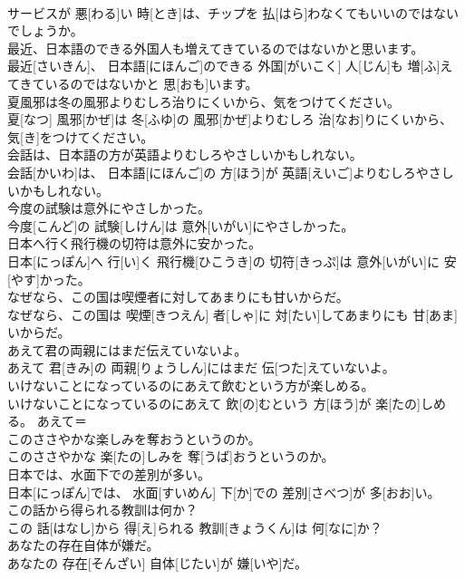 \documentclass[8pt]{extreport}
\begin{document}
\begin{CJK}{UTF8}{min}
\\	サービスが 悪[わる]い 時[とき]は、チップを 払[はら]わなくてもいいのではないでしょうか。	
\\	最近、日本語のできる外国人も増えてきているのではないかと思います。	
\\	最近[さいきん]、 日本語[にほんご]のできる 外国[がいこく] 人[じん]も 増[ふ]えてきているのではないかと 思[おも]います。	
\\	夏風邪は冬の風邪よりむしろ治りにくいから、気をつけてください。	
\\	夏[なつ] 風邪[かぜ]は 冬[ふゆ]の 風邪[かぜ]よりむしろ 治[なお]りにくいから、 気[き]をつけてください。	
\\	会話は、日本語の方が英語よりむしろやさしいかもしれない。	
\\	会話[かいわ]は、 日本語[にほんご]の 方[ほう]が 英語[えいご]よりむしろやさしいかもしれない。	
\\	今度の試験は意外にやさしかった。	
\\	今度[こんど]の 試験[しけん]は 意外[いがい]にやさしかった。	
\\	日本へ行く飛行機の切符は意外に安かった。	
\\	日本[にっぽん]へ 行[い]く 飛行機[ひこうき]の 切符[きっぷ]は 意外[いがい]に 安[やす]かった。	
\\	なぜなら、この国は喫煙者に対してあまりにも甘いからだ。	
\\	なぜなら、この国は 喫煙[きつえん] 者[しゃ]に 対[たい]してあまりにも 甘[あま]いからだ。	
\\	あえて君の両親にはまだ伝えていないよ。	
\\	あえて 君[きみ]の 両親[りょうしん]にはまだ 伝[つた]えていないよ。	
\\	いけないことになっているのにあえて飲むという方が楽しめる。	
\\	いけないことになっているのにあえて 飲[の]むという 方[ほう]が 楽[たの]しめる。	あえて＝ 
\\	このささやかな楽しみを奪おうというのか。	
\\	このささやかな 楽[たの]しみを 奪[うば]おうというのか。	
\\	日本では、水面下での差別が多い。	
\\	日本[にっぽん]では、 水面[すいめん] 下[か]での 差別[さべつ]が 多[おお]い。	
\\	この話から得られる教訓は何か？	
\\	この 話[はなし]から 得[え]られる 教訓[きょうくん]は 何[なに]か？	
\\	あなたの存在自体が嫌だ。	
\\	あなたの 存在[そんざい] 自体[じたい]が 嫌[いや]だ。	

\end{CJK}
\end{document}
